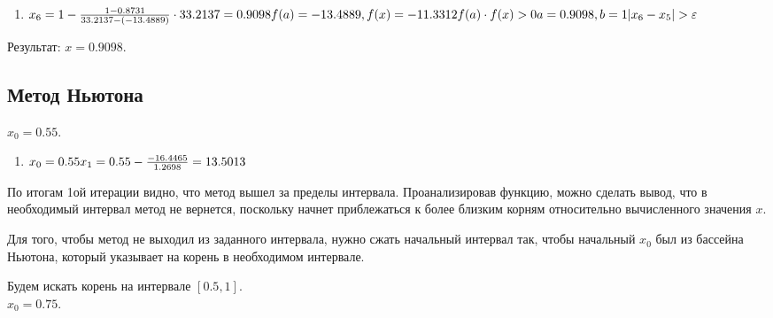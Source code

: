 \documentclass{article}
\begin{document}
\begin{enumerate}[label= итерация \arabic{*}:]
  \item 
  \begin{math}
    x_{6}=1 -
    \frac{1-0.8731}{33.2137-(-13.4889)} \cdot
    33.2137=0.9098\\
    f(a) = -13.4889, f(x)=-11.3312\\
    f(a) \cdot f(x) >0 \\
    a=0.9098, b=1\\
    |x_{6} - x_{5}| > \varepsilon \\ 
  \end{math}
\end{enumerate}
Результат: $x = 0.9098$.

\subsection{Метод Ньютона}
$x_{0}=0.55$.
\begin{enumerate}[label= итерация \arabic{*}:]
  \item
  \begin{math}
    x_{0}=0.55\\
    x_{1} = 0.55 - \frac{-16.4465}{1.2698} = 13.5013
  \end{math}
\end{enumerate}
По итогам 1ой итерации видно, что метод вышел за пределы интервала.
Проанализировав функцию, можно сделать вывод, что в необходимый интервал метод не вернется,
поскольку начнет приблежаться к более близким корням относительно вычисленного
значения $x$.

Для того, чтобы метод не выходил из заданного интервала, нужно сжать
начальный интервал так, чтобы начальный $x_0$ был из бассейна Ньютона, который
указывает на корень в необходимом интервале.

Будем искать корень на интервале $[0.5, 1]$.\\
$x_{0}=0.75$.
\end{document}
